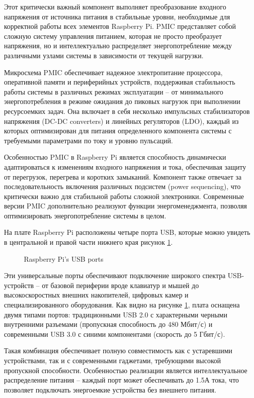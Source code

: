 Этот критически важный компонент выполняет преобразование входного напряжения от источника питания в стабильные уровни, необходимые для корректной работы всех элементов Raspberry Pi. PMIC представляет собой сложную систему управления питанием, которая не просто преобразует напряжения, но и интеллектуально распределяет энергопотребление между различными узлами системы в зависимости от текущей нагрузки.

Микросхема PMIC обеспечивает надежное электропитание процессора, оперативной памяти и периферийных устройств, поддерживая стабильность работы системы в различных режимах эксплуатации -- от минимального энергопотребления в режиме ожидания до пиковых нагрузок при выполнении ресурсоемких задач. Она включает в себя несколько импульсных стабилизаторов напряжения (DC-DC converters) и линейных регуляторов (LDO), каждый из которых оптимизирован для питания определенного компонента системы с требуемыми параметрами по току и уровню пульсаций.

Особенностью PMIC в Raspberry Pi является способность динамически адаптироваться к изменениям входного напряжения и тока, обеспечивая защиту от перегрузок, перегрева и коротких замыканий. Компонент также отвечает за последовательность включения различных подсистем (power sequencing), что критически важно для стабильной работы сложной электроники. Современные версии PMIC дополнительно реализуют функции энергоменеджмента, позволяя оптимизировать энергопотребление системы в целом.

На плате Raspberry Pi расположены четыре порта USB, которые можно увидеть в центральной и правой части нижнего края рисунок \ref{fig:usb}.

\begin{figure}[H]
	\centering
	\caption{Raspberry Pi's USB ports}
	\label{fig:usb}
\end{figure}

Эти универсальные порты обеспечивают подключение широкого спектра USB-устройств -- от базовой периферии вроде клавиатур и мышей до высокоскоростных внешних накопителей, цифровых камер и специализированного оборудования. Как видно на рисунке \ref{fig:usb}, плата оснащена двумя типами портов: традиционными USB 2.0 с характерными черными внутренними разъемами (пропускная способность до 480 Мбит/с) и современными USB 3.0 с синими компонентами (скорость до 5 Гбит/с).

Такая комбинация обеспечивает полную совместимость как с устаревшими устройствами, так и с современными гаджетами, требующими высокой пропускной способности. Особенностью реализации является интеллектуальное распределение питания -- каждый порт может обеспечивать до 1.5А тока, что позволяет подключать энергоемкие устройства без внешнего питания.

